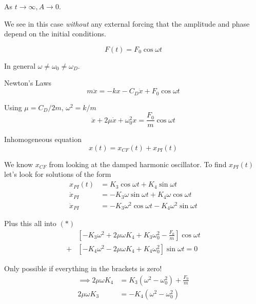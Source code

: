 \documentclass[10pt]{scrartcl}
\begin{document}
As $t \to \infty, A \to 0$. 

We see in this case \emph{without} any external forcing that the amplitude and phase depend on the initial conditions.




\begin{center}
\end{center}
\[F(t) = F_0\cos\omega t\]

In general  $\omega \neq \omega_0 \neq \omega_D$. 

Newton's Laws
\[m\ddot{x} = -kx - C_D\dot{x} + F_0\cos\omega t\] 

Using $\mu = C_D/2m$, $\omega^2 = k/m$
\[\ddot{x} + 2\mu\dot{x} + \omega_0^2x = \frac{F_0}{m}\cos\omega t \tag{*}\]

Inhomogeneous equation
\[x(t) = x_{CF}(t) + x_{PI}(t)\]

We know $x_{CF}$ from looking at the damped harmonic oscillator. To find $x_{PI}(t)$ let's look for solutions of the form
\[
\begin{aligned}
  x_{PI}(t) &= K_3\cos\omega t + K_4\sin\omega t\\
  \dot{x}_{PI} &= -K_3\omega\sin\omega t + K_4\omega\cos\omega t\\
  \ddot{x}_{PI} &= -K_3\omega^2\cos\omega t -K_4\omega^2\sin\omega t
\end{aligned}
\]

Plus this all into $(*)$
\[
\begin{aligned}
  &[-K_3\omega^2 + 2\mu\omega K_4 + K_3\omega_0^2 - \frac{F_0}{m}]\cos\omega t\\
  + &[-K_4\omega^2 - 2\mu\omega K_4 + K_4\omega_0^2]\sin\omega t = 0
\end{aligned}
\]

Only possible if everything in the brackets is zero! 
\[
\begin{aligned}
  \implies 2\mu\omega K_4 &= K_3(\omega^2 - \omega_0^2) + \frac{F_0}{m}\\
  2\mu\omega K_3 &= -K_4(\omega^2 - \omega_0^2)
\end{aligned}
\]
\end{document}
